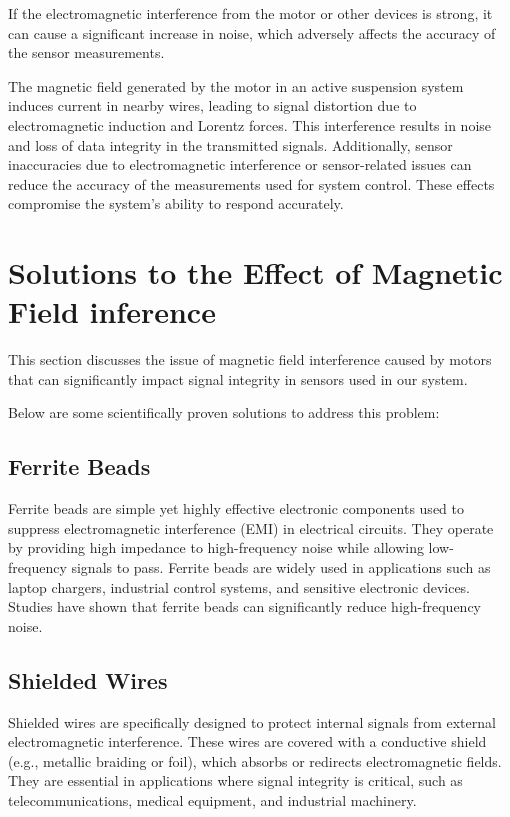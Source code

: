 If the electromagnetic interference from the motor or other devices is strong, it can cause a significant increase in noise, which adversely affects the accuracy of the sensor measurements.


The magnetic field generated by the motor in an active suspension system induces current in nearby wires, leading to signal distortion due to electromagnetic induction and Lorentz forces. This interference results in noise and loss of data integrity in the transmitted signals. Additionally, sensor inaccuracies due to electromagnetic interference or sensor-related issues can reduce the accuracy of the measurements used for system control. These effects compromise the system's ability to respond accurately.

\section {Solutions to the Effect of Magnetic Field inference}

This section discusses the issue of magnetic field interference caused by motors that can significantly impact signal integrity in sensors used in our system.

Below are some scientifically proven solutions to address this problem:

\subsection {Ferrite Beads}
Ferrite beads are simple yet highly effective electronic components used to suppress electromagnetic interference (EMI) in electrical circuits. They operate by providing high impedance to high-frequency noise while allowing low-frequency signals to pass. Ferrite beads are widely used in applications such as laptop chargers, industrial control systems, and sensitive electronic devices. Studies have shown that ferrite beads can significantly reduce high-frequency noise.



\subsection {Shielded Wires}
Shielded wires are specifically designed to protect internal signals from external electromagnetic interference. These wires are covered with a conductive shield (e.g., metallic braiding or foil), which absorbs or redirects electromagnetic fields. They are essential in applications where signal integrity is critical, such as telecommunications, medical equipment, and industrial machinery.


